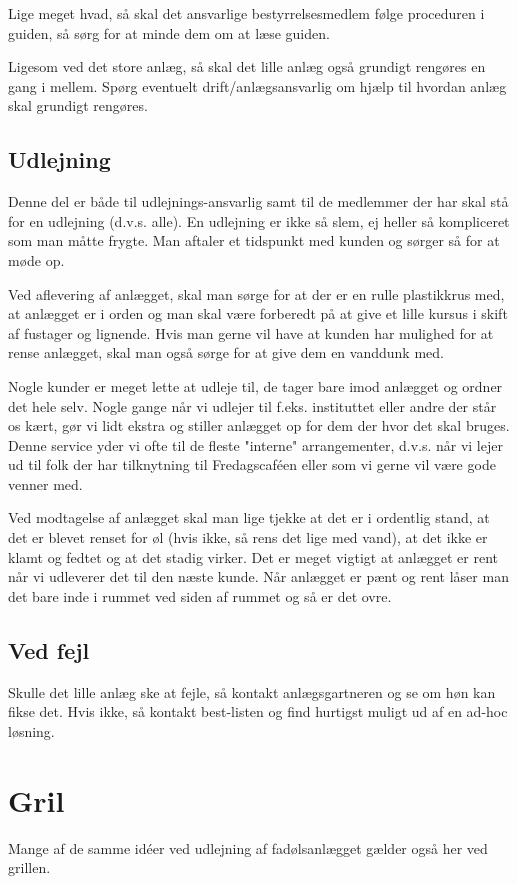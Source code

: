 Lige meget hvad, så skal det ansvarlige bestyrrelsesmedlem følge proceduren i guiden, så sørg for at minde dem om at læse guiden.


Ligesom ved det store anlæg, så skal det lille anlæg også grundigt rengøres en gang i mellem. Spørg eventuelt drift/anlægsansvarlig om hjælp til hvordan anlæg skal grundigt rengøres.

\subsection{Udlejning}
Denne del er både til udlejnings-ansvarlig samt til de medlemmer der har skal stå for en udlejning (d.v.s. alle). En udlejning er ikke så slem, ej heller så kompliceret som man måtte frygte. Man aftaler et tidspunkt med kunden og sørger så for at møde op.

Ved aflevering af anlægget, skal man sørge for at der er en rulle plastikkrus med, at anlægget er i orden og man skal være forberedt på at give et lille kursus i skift af fustager og lignende. Hvis man gerne vil have at kunden har mulighed for at rense anlægget, skal man også sørge for at give dem en vanddunk med.

Nogle kunder er meget lette at udleje til, de tager bare imod anlægget og ordner det hele selv. Nogle gange når vi udlejer til f.eks. instituttet eller andre der står os kært, gør vi lidt ekstra og stiller anlægget op for dem der hvor det skal bruges. Denne service yder vi ofte til de fleste "interne" arrangementer, d.v.s. når vi lejer ud til folk der har tilknytning til Fredagscaféen eller som vi gerne vil være gode venner med.

Ved modtagelse af anlægget skal man lige tjekke at det er i ordentlig stand, at det er blevet renset for øl (hvis ikke, så rens det lige med vand), at det ikke er klamt og fedtet og at det stadig virker. Det er meget vigtigt at anlægget er rent når vi udleverer det til den næste kunde. Når anlægget er pænt og rent låser man det bare inde i rummet ved siden af rummet og så er det ovre. 
\subsection{Ved fejl}
Skulle det lille anlæg ske at fejle, så kontakt anlægsgartneren og se om høn kan fikse det. Hvis ikke, så kontakt best-listen og find hurtigst muligt ud af en ad-hoc løsning.

\section{Gril}
Mange af de samme idéer ved udlejning af fadølsanlægget gælder også her ved grillen.

